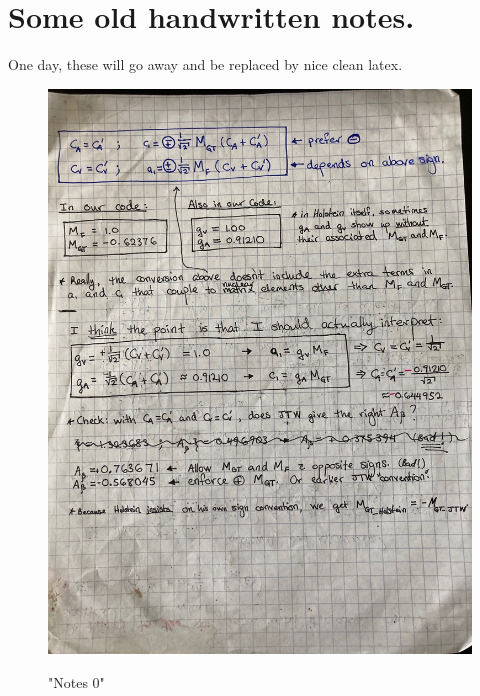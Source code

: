 \section{Some old handwritten notes.}
One day, these will go away and be replaced by nice clean latex.
\begin{figure}[htb]
	\centering
	{\includegraphics[width=.999\linewidth]
	{Figures/oldnotes_holstein_jtw/image0.jpg} }
	\caption{"Notes 0"}
	\label{fig:notes0}
\end{figure}

